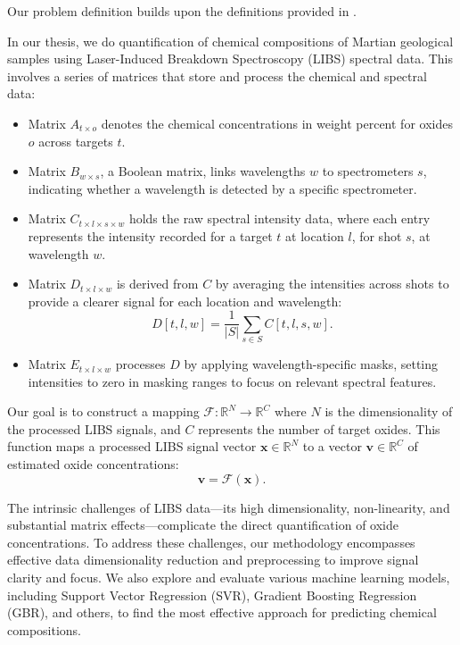 Our problem definition builds upon the definitions provided in \citet{p9_paper}.

In our thesis, we do quantification of chemical compositions of Martian geological samples using Laser-Induced Breakdown Spectroscopy (LIBS) spectral data.
This involves a series of matrices that store and process the chemical and spectral data:

\begin{itemize}
    \item Matrix \(A_{t \times o}\) denotes the chemical concentrations in weight percent for oxides \(o\) across targets \(t\).
    \item Matrix \(B_{w \times s}\), a Boolean matrix, links wavelengths \(w\) to spectrometers \(s\), indicating whether a wavelength is detected by a specific spectrometer.
    \item Matrix \(C_{t \times l \times s \times w}\) holds the raw spectral intensity data, where each entry represents the intensity recorded for a target \(t\) at location \(l\), for shot \(s\), at wavelength \(w\).
    \item Matrix \(D_{t \times l \times w}\) is derived from \(C\) by averaging the intensities across shots to provide a clearer signal for each location and wavelength:
    \[
    D[t, l, w] = \frac{1}{|S|} \sum_{s \in S} C[t, l, s, w].
    \]
    \item Matrix \(E_{t \times l \times w}\) processes \(D\) by applying wavelength-specific masks, setting intensities to zero in masking ranges to focus on relevant spectral features.
\end{itemize}

Our goal is to construct a mapping \(\mathcal{F} : \mathbb{R}^N \rightarrow \mathbb{R}^C\) where \(N\) is the dimensionality of the processed LIBS signals, and \(C\) represents the number of target oxides. This function maps a processed LIBS signal vector \(\mathbf{x} \in \mathbb{R}^N\) to a vector \(\mathbf{v} \in \mathbb{R}^C\) of estimated oxide concentrations:
$$
\mathbf{v} = \mathcal{F}(\mathbf{x}).
$$

The intrinsic challenges of LIBS data—its high dimensionality, non-linearity, and substantial matrix effects—complicate the direct quantification of oxide concentrations. To address these challenges, our methodology encompasses effective data dimensionality reduction and preprocessing to improve signal clarity and focus. We also explore and evaluate various machine learning models, including Support Vector Regression (SVR), Gradient Boosting Regression (GBR), and others, to find the most effective approach for predicting chemical compositions.

